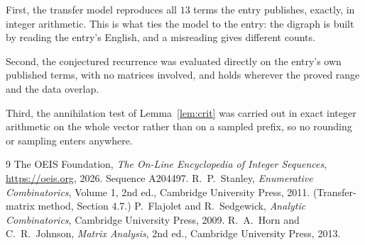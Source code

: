 \documentclass[11pt,a4paper]{article}
\theoremstyle{plain}
\theoremstyle{definition}
\begin{document}
First, the transfer model reproduces all $13$ terms the entry publishes, exactly, in
integer arithmetic. This is what ties the model to the entry: the digraph is built by reading
the entry's English, and a misreading gives different counts.

Second, the conjectured recurrence was evaluated directly on the entry's own published terms,
with no matrices involved, and holds wherever the proved range and the data overlap.

Third, the annihilation test of Lemma~\ref{lem:crit} was carried out in exact integer
arithmetic on the whole vector rather than on a sampled prefix, so no rounding or sampling
enters anywhere.

\begin{thebibliography}{9}
 The OEIS Foundation, \emph{The On-Line Encyclopedia of Integer
Sequences}, \url{https://oeis.org}, 2026. Sequence A204497.
 R.~P.~Stanley, \emph{Enumerative Combinatorics}, Volume 1, 2nd ed.,
Cambridge University Press, 2011. (Transfer-matrix method, Section 4.7.)
 P.~Flajolet and R.~Sedgewick, \emph{Analytic Combinatorics}, Cambridge
University Press, 2009.
 R.~A.~Horn and C.~R.~Johnson, \emph{Matrix Analysis}, 2nd ed., Cambridge
University Press, 2013.
\end{thebibliography}
\end{document}
